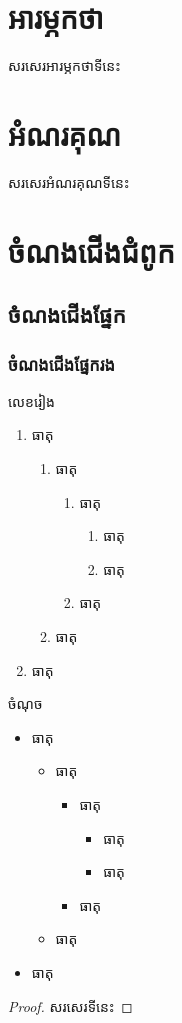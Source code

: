 \documentclass[12pt,a4paper]{book}
\begin{document}
	\frontmatter
	\tableofcontents
	\clearpage
	\chapter{អារម្ភកថា}
	សរសេរអារម្ភកថាទីនេះ
	\chapter{អំណរគុណ}
	សរសេរអំណរគុណទីនេះ
	\mainmatter
	\chapter{ចំណងជើងជំពូក}
	\section{ចំណងជើងផ្នែក}
	\subsection{ចំណងជើងផ្នែករង}
	\begin{dfn}
		លេខរៀង
		\begin{enumerate}
			\item ធាតុ
			\begin{enumerate}
				\item ធាតុ
				\begin{enumerate}
					\item ធាតុ
					\begin{enumerate}
						\item ធាតុ
						\item ធាតុ
					\end{enumerate}
					\item ធាតុ
				\end{enumerate}
				\item ធាតុ
			\end{enumerate}
			\item ធាតុ
		\end{enumerate}
	\end{dfn}
\begin{thm}
	ចំណុច
	\begin{itemize}
		\item ធាតុ
		\begin{itemize}
			\item ធាតុ
			\begin{itemize}
				\item ធាតុ
				\begin{itemize}
					\item ធាតុ
					\item ធាតុ
				\end{itemize}
				\item ធាតុ
			\end{itemize}
			\item ធាតុ
		\end{itemize}
		\item ធាតុ
	\end{itemize}
\end{thm}
\begin{proof}
	សរសេរទីនេះ
\end{proof}
\end{document}
